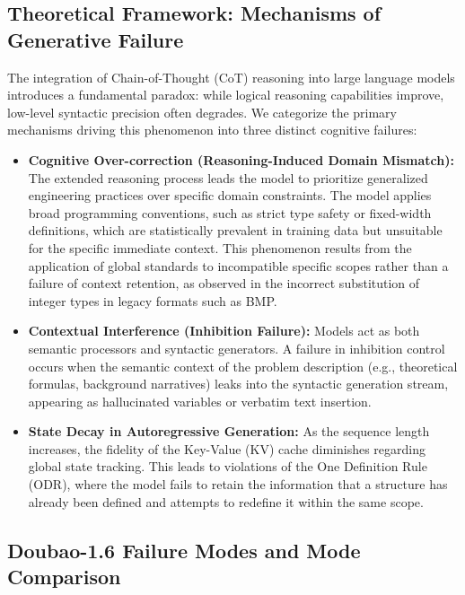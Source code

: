 \documentclass{article}
\theoremstyle{plain}
\theoremstyle{definition}
\theoremstyle{remark}
\begin{document}
\subsection{Theoretical Framework: Mechanisms of Generative Failure}
\label{sec:theoretical_framework}

The integration of Chain-of-Thought (CoT) reasoning into large language models introduces a fundamental paradox: while logical reasoning capabilities improve, low-level syntactic precision often degrades. We categorize the primary mechanisms driving this phenomenon into three distinct cognitive failures:

\begin{itemize}
    \item \textbf{Cognitive Over-correction (Reasoning-Induced Domain Mismatch):} The extended reasoning process leads the model to prioritize generalized engineering practices over specific domain constraints. The model applies broad programming conventions, such as strict type safety or fixed-width definitions, which are statistically prevalent in training data but unsuitable for the specific immediate context. This phenomenon results from the application of global standards to incompatible specific scopes rather than a failure of context retention, as observed in the incorrect substitution of integer types in legacy formats such as BMP.

    \item \textbf{Contextual Interference (Inhibition Failure):} Models act as both semantic processors and syntactic generators. A failure in inhibition control occurs when the semantic context of the problem description (e.g., theoretical formulas, background narratives) leaks into the syntactic generation stream, appearing as hallucinated variables or verbatim text insertion.
    
    \item \textbf{State Decay in Autoregressive Generation:} As the sequence length increases, the fidelity of the Key-Value (KV) cache diminishes regarding global state tracking. This leads to violations of the One Definition Rule (ODR), where the model fails to retain the information that a structure has already been defined and attempts to redefine it within the same scope.
\end{itemize}

\subsection{Doubao-1.6 Failure Modes and Mode Comparison}
\label{sec:doubao_analysis}
\end{document}
